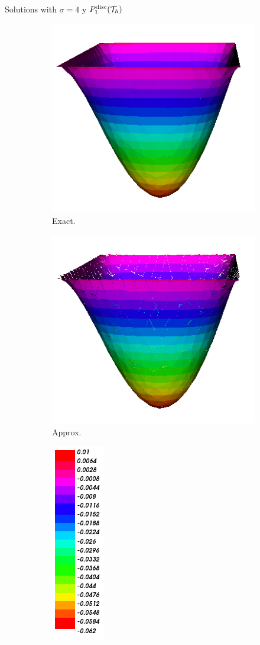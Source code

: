 \begin{frame}{Solutions with $\sigma=4$ y $\relax{P}^{\text{disc}}_1(\mathcal{T}_h)$}
		\begin{figure}[h!]
			\begin{subfigure}[b]{0.2\textwidth}
				\centering
				\includegraphics[scale=0.16]{img/Difusion/Recortes/steady_diffusion_exact_n_16.png}
				\caption{\scriptsize Exact.}
			\end{subfigure}
			\begin{subfigure}[b]{0.2\textwidth}
				\centering
				\includegraphics[scale=0.16]{img/Difusion/Recortes/steady_diffusion_approx_n_16.png}
				\caption{\scriptsize Approx.}
			\end{subfigure}
			\begin{subfigure}[b]{0.1\textwidth}
				\centering
				\includegraphics[scale=0.23]{img/Difusion/Recortes/steady_diffusion_values.png}

\end{subfigure}
\end{figure}
\end{frame}

